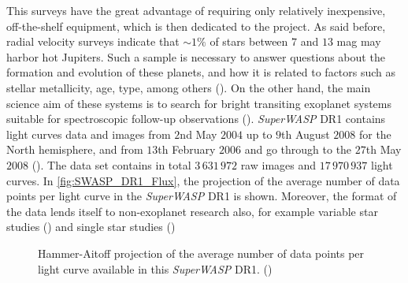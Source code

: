 This surveys have the great advantage of requiring only relatively inexpensive, off-the-shelf equipment, which is then dedicated to the project. As said before, radial velocity surveys indicate that $\sim 1\%$ of stars between $7$ and $13$ mag may harbor hot Jupiters. Such a sample is necessary to answer questions about the formation and evolution of these planets, and how it is related to factors such as stellar metallicity, age, type, among others  (\citeyear{2003ASPC..294..405S}). On the other hand, the main science aim of these systems is to search for bright transiting exoplanet systems suitable for spectroscopic follow-up observations  (\citeyear{2003ASPC..294..405S}). \textit{SuperWASP} DR1 contains light curves data and images from $2$nd May $2004$ up to $9$th August $2008$ for the North hemisphere, and from $13$th February $2006$ and go through to the $27$th May $2008$  (\citeyear{2010A&A...520L..10B}). The data set contains in total $3\,631\,972$ raw images and $17\,970\,937$ light curves. In \autoref{fig:SWASP_DR1_Flux}, the projection of the average number of data points per light curve in the \textit{SuperWASP} DR1 is shown. Moreover, the format of the data lends itself to non-exoplanet research also, for example variable star studies  (\citeyear{2007A&A...467..785N}) and single star studies  (\citeyear{2007MNRAS.380.1230C})\\  

\begin{figure}[!ht]
\centering
\caption{\scriptsize{  Hammer-Aitoff projection of the average number of data
points per light curve available in this \textit{SuperWASP} DR1.  (\citeyear{2010A&A...520L..10B})}}
\label{fig:SWASP_DR1_Flux}
\end{figure}

